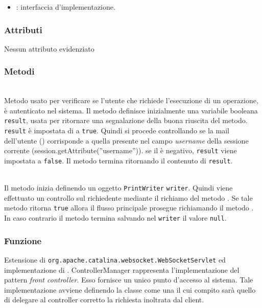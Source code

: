 \begin{itemize}
	\item {}: interfaccia d'implementazione.
\end{itemize}

\subsubsection*{Attributi}

Nessun attributo evidenziato

\subsubsection*{Metodi}

\begin{description}
	\item{}\\
	Metodo usato per verificare se l'utente che richiede l'esecuzione di un operazione, è autenticato nel sistema. Il metodo definisce inizialmente una variabile booleana \texttt{result}, usata per ritornare una segnalazione della buona riuscita del metodo. \texttt{result} è impostata di  a \texttt{true}. Quindi si procede controllando se la mail dell'utente () corrisponde a quella presente nel campo \textit{username} della sessione corrente (session.getAttribute(''username'')). se il  è negativo, \texttt{result} viene impostata a \texttt{false}. Il metodo termina ritornando il contenuto di \texttt{result}.
	\item{}\\
	Il metodo inizia definendo un oggetto \texttt{PrintWriter} \texttt{writer}. Quindi viene effettuato un controllo sul richiedente mediante il richiamo del metodo . Se tale metodo ritorna \texttt{true} allora il flusso principale prosegue richiamando il metodo . In caso contrario il metodo termina salvando nel \texttt{writer} il valore \texttt{null}.
\end{description}


\subsubsection*{Funzione}
Estensione di \texttt{org.apache.catalina.websocket.WebSocketServlet} ed implementazione di . ControllerManager rappresenta l'implementazione del pattern \textit{front controller}. Esso fornisce un unico punto d'accesso al sistema. Tale implementazione avviene definendo la classe come una  il cui compito sarà quello di delegare al controller corretto la richiesta inoltrata dal client.

